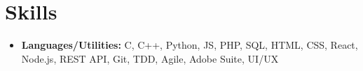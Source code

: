 \documentclass[10.8pt, a4paper]{extarticle}
\newcommand{\shorterSection}[1]{\vspace{-10pt}\section{#1}}
\begin{document}

\shorterSection{Skills}
\vspace{-2pt}
\begin{itemize}
    \item \textbf{Languages/Utilities:} C, C++, Python, JS, PHP, SQL, HTML, CSS, React, Node.js, REST API, Git, TDD, Agile, Adobe Suite, UI/UX
\end{itemize}
\vspace{0.055cm}
\end{document}
